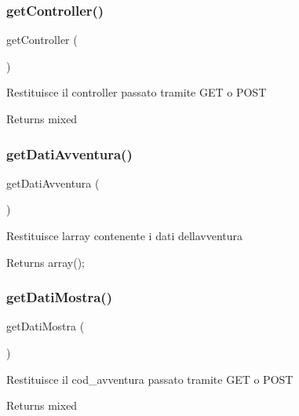 \subsubsection{\texorpdfstring{get\+Controller()}{getController()}}
{\footnotesize\ttfamily get\+Controller (\begin{DoxyParamCaption}{ }\end{DoxyParamCaption})}

Restituisce il controller passato tramite G\+ET o P\+O\+ST

\begin{DoxyReturn}{Returns}
mixed 
\end{DoxyReturn}
\mbox{\label{class_v_upload_aff474932615e2b87b025f2ab9ba68598}} 
\subsubsection{\texorpdfstring{get\+Dati\+Avventura()}{getDatiAvventura()}}
{\footnotesize\ttfamily get\+Dati\+Avventura (\begin{DoxyParamCaption}{ }\end{DoxyParamCaption})}

Restituisce l\textquotesingle{}array contenente i dati dell\textquotesingle{}avventura

\begin{DoxyReturn}{Returns}
array(); 
\end{DoxyReturn}
\mbox{\label{class_v_upload_a21c1b6e37828f68cadec73d5fe012eef}} 
\subsubsection{\texorpdfstring{get\+Dati\+Mostra()}{getDatiMostra()}}
{\footnotesize\ttfamily get\+Dati\+Mostra (\begin{DoxyParamCaption}{ }\end{DoxyParamCaption})}

Restituisce il cod\+\_\+avventura passato tramite G\+ET o P\+O\+ST

\begin{DoxyReturn}{Returns}
mixed 
\end{DoxyReturn}
\mbox{\label{class_v_upload_a218c2a53843b2af2e9b28c40d67b5914}} 
